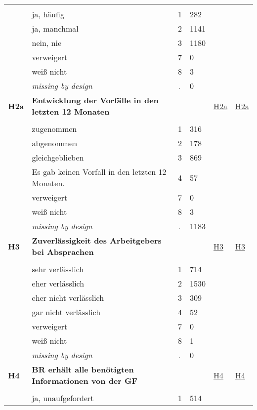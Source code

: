 \begin{longtable}{| L{2.45cm} | L{6cm} | C{1.5cm} | R{1cm} | C{2.25cm} | C{2.25cm} |}
   &  &  &  &  &  \\ 
   & ja, häufig & 1 & 282 &  &  \\ 
   & ja, manchmal & 2 & 1141 &  &  \\ 
   & nein, nie & 3 & 1180 &  &  \\ 
   & verweigert & 7 & 0 &  &  \\ 
   & weiß nicht & 8 & 3 &  &  \\ 
   & \textit{missing by design} & \textit{.} & 0 &  &  \\ 
   \midrule
\textbf{H2a}\label{var:H2a} & \textbf{Entwicklung der Vorfälle in den letzten 12 Monaten} &  &  & \hyperref[H2a]{H2a} & \hyperref[var:suf:H2a]{H2a} \\ 
   &  &  &  &  &  \\ 
   & zugenommen & 1 & 316 &  &  \\ 
   & abgenommen & 2 & 178 &  &  \\ 
   & gleichgeblieben & 3 & 869 &  &  \\ 
   & Es gab keinen Vorfall in den letzten 12 Monaten. & 4 & 57 &  &  \\ 
   & verweigert & 7 & 0 &  &  \\ 
   & weiß nicht & 8 & 3 &  &  \\ 
   & \textit{missing by design} & \textit{.} & 1183 &  &  \\ 
   \midrule
\textbf{H3}\label{var:H3} & \textbf{Zuverlässigkeit des Arbeitgebers bei Absprachen} &  &  & \hyperref[H3]{H3} & \hyperref[var:suf:H3]{H3} \\ 
   &  &  &  &  &  \\ 
   & sehr verlässlich & 1 & 714 &  &  \\ 
   & eher verlässlich & 2 & 1530 &  &  \\ 
   & eher nicht verlässlich & 3 & 309 &  &  \\ 
   & gar nicht verlässlich & 4 & 52 &  &  \\ 
   & verweigert & 7 & 0 &  &  \\ 
   & weiß nicht & 8 & 1 &  &  \\ 
   & \textit{missing by design} & \textit{.} & 0 &  &  \\ 
   \midrule
\textbf{H4}\label{var:H4} & \textbf{BR erhält alle benötigten Informationen von der GF} &  &  & \hyperref[H4]{H4} & \hyperref[var:suf:H4]{H4} \\ 
   &  &  &  &  &  \\ 
   & ja, unaufgefordert & 1 & 514 &  &  \\ 

\end{longtable}
